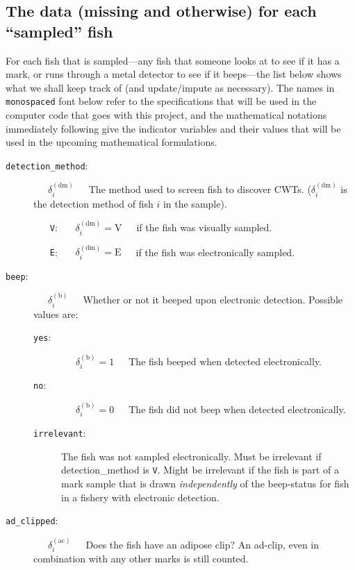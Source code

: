 \documentclass[11pt]{article}
\begin{document}
\subsection{The data (missing and otherwise) for each ``sampled'' fish}

For each fish that is sampled---any fish that someone looks at to see if it has a mark, or
runs  through a metal detector to see if it beeps---the list below shows what we shall keep track of (and
update/impute as necessary).  The names in {\tt monospaced} font below refer to the specifications that
will be used in the computer code that goes with this project, and the mathematical notations immediately
following give
the indicator variables and their values that will be used in the upcoming mathematical formulations.
\begin{description}
	\item [{\tt detection\_method}:] ~~~$\delta_i^{(\mathrm{dm})}$~~~The method used to screen fish to discover CWTs. ($\delta_i^{(\mathrm{dm})}$ is the detection method of fish $i$ in the sample).
	\begin{itemize}
		\item [{\tt V}:] ~~~$\delta_i^{(\mathrm{dm})} = \mathrm{V}$~~~if the fish was visually sampled.
		\item [{\tt E}:] ~~~$\delta_i^{(\mathrm{dm})} = \mathrm{E}$~~~if the fish was electronically sampled.
	\end{itemize}
	\item [{\tt beep}:] ~~~$\delta_i^{(\mathrm{b})}$~~~Whether or not it beeped upon electronic detection. Possible values are:
	\begin{description}
		\item [{\tt yes}:] ~~~$\delta_i^{(\mathrm{b})} = 1$~~~The fish beeped when detected electronically.
		\item [{\tt no}:]  ~~~$\delta_i^{(\mathrm{b})} = 0$~~~The fish did not beep when detected electronically.
		\item [{\tt irrelevant}:] The fish was not sampled electronically.
		Must be irrelevant if detection\_method is {\tt V}. Might be irrelevant if the fish is part of a
		mark sample that is drawn {\em independently} of the beep-status for fish in a fishery with
		electronic detection.
	\end{description}
	\item [{\tt ad\_clipped}:]  ~~~$\delta_i^{(\mathrm{ac})}$~~~Does the fish have an adipose clip? 	An ad-clip, even in combination with any other marks is still counted.
	\begin{description}

\end{description}
\end{description}
\end{document}
